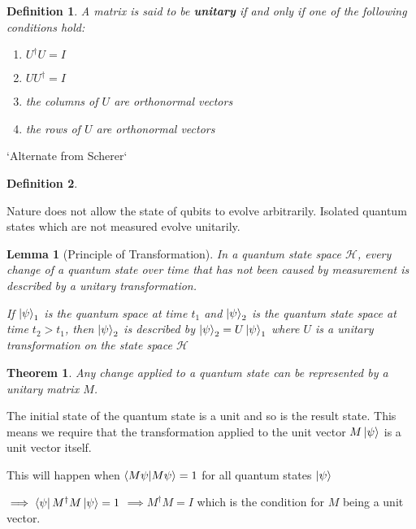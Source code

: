 \documentclass[12pt,twoside,fleqn]{report}
\makeatletter
\theoremstyle{thmstyle}
\renewenvironment{proof}[1][\proofname]{\par
\pushQED{\qed}%
\normalfont \topsep6\p@\@plus6\p@\relax
\trivlist
\item[\hskip\labelsep\itshape#1\@addpunct{.}]\mbox{}\par\nobreak\ignorespaces
}{%
    \popQED\endtrivlist\@endpefalse
    }
\newtheorem{defn}{Definition}[chapter]
\newtheorem{thm}{Theorem}[chapter]
\newtheorem{lemma}{Lemma}[chapter]
\makeatother
\begin{document}
\begin{defn}
    A matrix is said to be \textbf{unitary} if and only if one of the following conditions hold:
    \begin{enumerate}
        \item $U^\dagger U = I$
        \item $U U^\dagger = I$
        \item the columns of $U$ are orthonormal vectors
        \item the rows of $U$ are orthonormal vectors
    \end{enumerate}
\end{defn}

`Alternate from Scherer`
\begin{defn}
\end{defn}


Nature does not allow the state of qubits to evolve arbitrarily. Isolated quantum states which are not measured evolve unitarily.

\begin{samepage}
\begin{mdframed}
\begin{lemma}[Principle of Transformation]
    \label{transformation}
    In a quantum state space $\mathcal{H}$, every change of a quantum state over time that has not been caused by measurement is described by a unitary transformation.
    
    If $\ket{\psi}_1$ is the quantum space at time $t_1$ and $\ket{\psi}_2$ is the quantum state space at time $t_2 > t_1$, then $\ket{\psi}_2$ is described by $\ket{\psi}_2 = U \ket{\psi}_1$ where $U$ is a unitary transformation on the state space $\mathcal{H}$
\end{lemma}
\end{mdframed}
\end{samepage}

\begin{thm}
    Any change applied to a quantum state can be represented by a unitary matrix $M$.
\end{thm}
\begin{proof}
    The initial state of the quantum state is a unit and so is the result state. This means we require that the transformation applied to the unit vector $M \ket{\psi}$ is a unit vector itself.

    This will happen when $\braket{M \psi | M\psi} = 1$ for all quantum states $\ket{\psi}$

    $\implies \bra{\psi} M^\dagger M \ket{\psi} = 1$
    $\implies M^\dagger M = I$ which is the condition for $M$ being a unit vector.
\end{proof}
\end{document}

